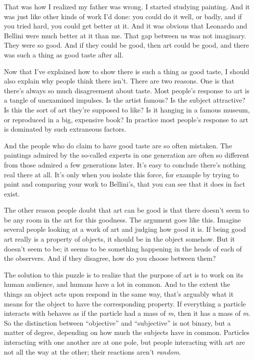 That was how I realized my father was wrong. I started studying
painting. And it was just like other kinds of work I'd done: you could
do it well, or badly, and if you tried hard, you could get better at it.
And it was obvious that Leonardo and Bellini were much better at it than
me. That gap between us was not imaginary. They were so good. And if
they could be good, then art could be good, and there was such a thing
as good taste after all.

Now that I've explained how to show there is such a thing as good taste,
I should also explain why people think there isn't. There are two
reasons. One is that there's always so much disagreement about taste.
Most people's response to art is a tangle of unexamined impulses. Is the
artist famous? Is the subject attractive? Is this the sort of art
they're supposed to like? Is it hanging in a famous museum, or
reproduced in a big, expensive book? In practice most people's response
to art is dominated by such extraneous factors.

And the people who do claim to have good taste are so often mistaken.
The paintings admired by the so-called experts in one generation are
often so different from those admired a few generations later. It's easy
to conclude there's nothing real there at all. It's only when you
isolate this force, for example by trying to paint and comparing your
work to Bellini's, that you can see that it does in fact exist.

The other reason people doubt that art can be good is that there doesn't
seem to be any room in the art for this goodness. The argument goes like
this. Imagine several people looking at a work of art and judging how
good it is. If being good art really is a property of objects, it should
be in the object somehow. But it doesn't seem to be; it seems to be
something happening in the heads of each of the observers. And if they
disagree, how do you choose between them?

The solution to this puzzle is to realize that the purpose of art is to
work on its human audience, and humans have a lot in common. And to the
extent the things an object acts upon respond in the same way, that's
arguably what it means for the object to have the corresponding
property. If everything a particle interacts with behaves as if the
particle had a mass of \emph{m}, then it has a mass of \emph{m}. So the
distinction between ``objective'' and ``subjective'' is not binary, but
a matter of degree, depending on how much the subjects have in common.
Particles interacting with one another are at one pole, but people
interacting with art are not all the way at the other; their reactions
aren't \emph{random}.


